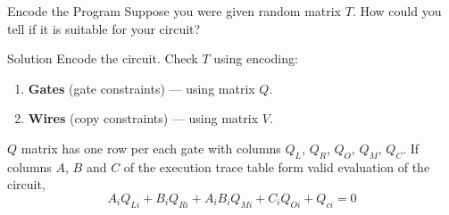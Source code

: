 \documentclass{zkdl-presentation-template}
\begin{document}
    \begin{frame}{Encode the Program}
        Suppose you were given random matrix $T$. How could you tell if it is suitable for your circuit?
        \begin{block}{Solution}
            Encode the circuit. Check $T$ using encoding:
            \begin{enumerate}
                \item \textbf{Gates} (gate constraints) --- using matrix $Q$.
                \item \textbf{Wires} (copy constraints) --- using matrix $V$.
            \end{enumerate}
        \end{block}

         \begin{definition}
            $Q$ matrix has one row per each gate with columns $Q_L$, $Q_R$, $Q_O$, $Q_M$, $Q_C$. If columns $A$, $B$ and $C$ of the execution trace table form valid evaluation of the circuit, 
            \[A_i Q_{Li} + B_i Q_{Ri} + A_i B_i Q_{Mi} + C_i Q_{Oi} + Q_{ci} = 0\]
        \end{definition}
    \end{frame}
\end{document}

